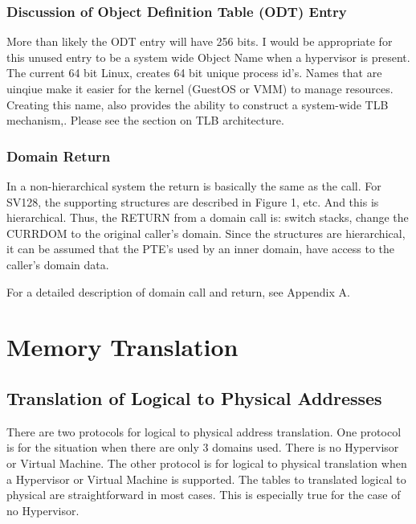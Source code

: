 \documentclass{article}
\begin{document}
\subsubsection{Discussion of Object Definition  Table (ODT) Entry}

More  than likely the ODT entry will have 256 bits.  I would be appropriate for this unused entry to be a system wide Object Name when a hypervisor is present.  The current  64 bit Linux,  creates 64 bit unique process id's.  
Names that are uinqiue make it easier for the kernel (GuestOS or VMM) to manage resources. Creating this name, also  provides the ability to construct a system-wide TLB mechanism,.  Please see the section on TLB architecture.


\subsubsection{Domain Return}

In a non-hierarchical system the return is basically the same as the call. For SV128, the supporting structures are described in Figure 1, etc.  And this is hierarchical.  Thus, the RETURN from a domain call is:  switch stacks,  change the CURRDOM to the original caller’s domain.  Since the structures are hierarchical,  it can be  assumed that the PTE’s used by an inner domain,  have access to the caller’s domain data. 

For a detailed description of domain call and return, see Appendix A.

\pagebreak
\section{Memory Translation}

\subsection{Translation of Logical to Physical Addresses}

There are two protocols for logical to  physical address translation.  One protocol is for the situation when there are only 3 domains used.  There is no Hypervisor or Virtual Machine.  The other protocol is for logical to  physical translation  when a Hypervisor or Virtual Machine is supported. The tables to translated logical to physical are straightforward in most cases.   This is especially true for the case of no Hypervisor.
\end{document}
